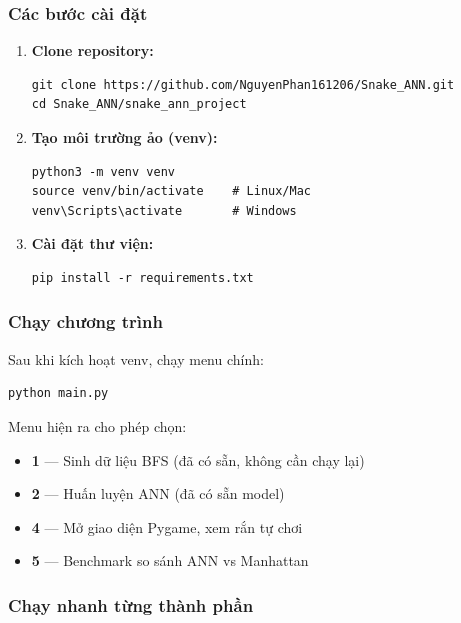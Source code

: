 \documentclass[12pt,a4paper]{article}
\begin{document}
\subsubsection{Các bước cài đặt}

\begin{enumerate}
    \item \textbf{Clone repository:}
    
    \begin{lstlisting}
git clone https://github.com/NguyenPhan161206/Snake_ANN.git
cd Snake_ANN/snake_ann_project
    \end{lstlisting}
    
    \item \textbf{Tạo môi trường ảo (venv):}
    
    \begin{lstlisting}
python3 -m venv venv
source venv/bin/activate    # Linux/Mac
venv\Scripts\activate       # Windows
    \end{lstlisting}
    
    \item \textbf{Cài đặt thư viện:}
    
    \begin{lstlisting}
pip install -r requirements.txt
    \end{lstlisting}
\end{enumerate}

\subsubsection{Chạy chương trình}

Sau khi kích hoạt venv, chạy menu chính:

\begin{lstlisting}
python main.py
\end{lstlisting}

Menu hiện ra cho phép chọn:

\begin{itemize}
    \item \textbf{1} --- Sinh dữ liệu BFS (đã có sẵn, không cần chạy lại)
    \item \textbf{2} --- Huấn luyện ANN (đã có sẵn model)
    \item \textbf{4} --- Mở giao diện Pygame, xem rắn tự chơi
    \item \textbf{5} --- Benchmark so sánh ANN vs Manhattan
\end{itemize}

\subsubsection{Chạy nhanh từng thành phần}
\end{document}
